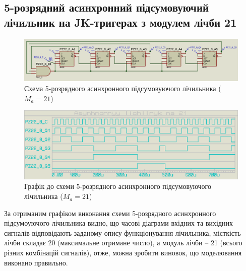 \documentclass{article}
\begin{document}
\begin{normalsize}
	\section*{5-розрядний асинхронний підсумовуючий лічильник на JK-тригерах з модулем лічби 21}	
	\begin{figure}[H]
		\centering
		\includegraphics[scale=0.25]{s4}	
		\caption{Схема 5-розрядного асинхронного підсумовуючого лічильника ($M_a=21$)}
	\end{figure}
	
	\begin{figure}[H]
		\centering
		\includegraphics[scale=0.25]{g4}	
		\caption{Графік до схеми 5-розрядного асинхронного підсумовуючого лічильника ($M_a=21$)}
	\end{figure}

За отриманим графіком виконання схеми 5-розрядного асинхронного підсумоуючого лічильника  видно, що часові діаграми вхідних та вихідних сигналів відповідають заданому опису функціонування лічильника, місткість лічби складає 20 (максимальне отримане число), а модуль лічби – 21 (всього різних комбінацій сигналів), отже, можна зробити виновок, що моделювання виконано правильно.
	
	\begin{figure}[H]
		\centering
	\end{figure}
	

\end{normalsize}
\end{document}
